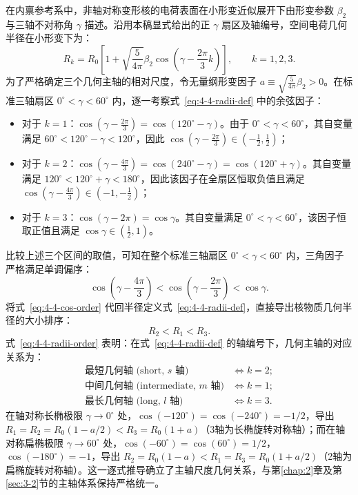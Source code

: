 在内禀参考系中，非轴对称变形核的电荷表面在小形变近似展开下由形变参数 $\beta_2$ 与三轴不对称角 $\gamma$ 描述。沿用本稿显式给出的正 $\gamma$ 扇区及轴编号，空间电荷几何半径在小形变下为：
\begin{equation}\label{eq:4-4-radii-def}
R_k = R_0 \left[ 1 + \sqrt{\frac{5}{4\pi}}\beta_2 \cos\left(\gamma - \frac{2\pi}{3} k\right) \right], \qquad k = 1, 2, 3.
\end{equation}
为了严格确定三个几何主轴的相对尺度，令无量纲形变因子 $a \equiv \sqrt{\frac{5}{4\pi}}\beta_2 > 0$。在标准三轴扇区 $0^\circ < \gamma < 60^\circ$ 内，逐一考察式~\eqref{eq:4-4-radii-def} 中的余弦因子：
\begin{itemize}
\item 对于 $k=1$：$\cos\left(\gamma - \frac{2\pi}{3}\right) = \cos\left(120^\circ - \gamma\right)$。由于 $0^\circ < \gamma < 60^\circ$，其自变量满足 $60^\circ < 120^\circ - \gamma < 120^\circ$，因此 $\cos\left(\gamma - \frac{2\pi}{3}\right) \in \left(-\frac{1}{2}, \frac{1}{2}\right)$；
\item 对于 $k=2$：$\cos\left(\gamma - \frac{4\pi}{3}\right) = \cos\left(240^\circ - \gamma\right) = \cos\left(120^\circ + \gamma\right)$。其自变量满足 $120^\circ < 120^\circ + \gamma < 180^\circ$，因此该因子在全扇区恒取负值且满足 $\cos\left(\gamma - \frac{4\pi}{3}\right) \in \left(-1, -\frac{1}{2}\right)$；
\item 对于 $k=3$：$\cos\left(\gamma - 2\pi\right) = \cos\gamma$。其自变量满足 $0^\circ < \gamma < 60^\circ$，该因子恒取正值且满足 $\cos\gamma \in \left(\frac{1}{2}, 1\right)$。
\end{itemize}
比较上述三个区间的取值，可知在整个标准三轴扇区 $0^\circ < \gamma < 60^\circ$ 内，三角因子严格满足单调偏序：
\begin{equation}\label{eq:4-4-cos-order}
\cos\left(\gamma - \frac{4\pi}{3}\right) < \cos\left(\gamma - \frac{2\pi}{3}\right) < \cos\gamma.
\end{equation}
将式~\eqref{eq:4-4-cos-order} 代回半径定义式~\eqref{eq:4-4-radii-def}，直接导出核物质几何半径的大小排序：
\begin{equation}\label{eq:4-4-radii-order}
R_2 < R_1 < R_3.
\end{equation}
式~\eqref{eq:4-4-radii-order} 表明：在式~\eqref{eq:4-4-radii-def} 的轴编号下，几何主轴的对应关系为：
\begin{equation}\label{eq:4-4-axes-identity}
\begin{aligned}
\text{最短几何轴 (short, $s$ 轴)} &\iff k = 2; \\
\text{中间几何轴 (intermediate, $m$ 轴)} &\iff k = 1; \\
\text{最长几何轴 (long, $l$ 轴)} &\iff k = 3.
\end{aligned}
\end{equation}
在轴对称长椭极限 $\gamma \to 0^\circ$ 处，$\cos(-120^\circ) = \cos(-240^\circ) = -1/2$，导出 $R_1 = R_2 = R_0(1 - a/2) < R_3 = R_0(1+a)$（3轴为长椭旋转对称轴）；而在轴对称扁椭极限 $\gamma \to 60^\circ$ 处，$\cos(-60^\circ) = \cos(60^\circ) = 1/2$，$\cos(-180^\circ) = -1$，导出 $R_2 = R_0(1-a) < R_1 = R_3 = R_0(1+a/2)$（2轴为扁椭旋转对称轴）。这一逐式推导确立了主轴尺度几何关系，与第\ref{chap:2}章及第\ref{sec:3-2}节的主轴体系保持严格统一。

